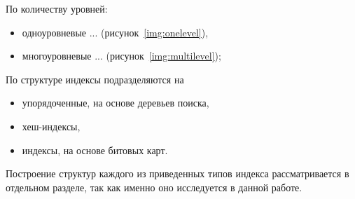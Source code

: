 По количеству уровней:
\begin{itemize}
    \item одноуровневые ... (рисунок~\ref{img:onelevel}),
    \item многоуровневые ... (рисунок~\ref{img:multilevel});
\end{itemize}

По структуре индексы подразделяются на
\begin{itemize}
    \item упорядоченные, на основе деревьев поиска,
    \item хеш-индексы,
    \item индексы, на основе битовых карт.
\end{itemize}

Построение структур каждого из приведенных типов индекса рассматривается в
отдельном разделе, так как именно оно исследуется в данной работе.

